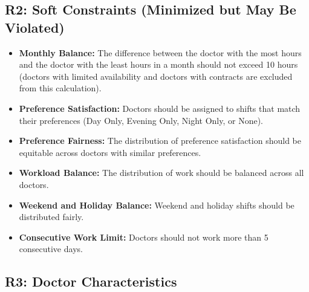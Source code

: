 \documentclass[12pt]{article}
\begin{document}
\subsection*{R2: Soft Constraints (Minimized but May Be Violated)}

\begin{itemize}
    \item \textbf{Monthly Balance:} The difference between the doctor with the most hours and the doctor with the least hours in a month should not exceed 10 hours (doctors with limited availability and doctors with contracts are excluded from this calculation).
    
    \item \textbf{Preference Satisfaction:} Doctors should be assigned to shifts that match their preferences (Day Only, Evening Only, Night Only, or None).
    
    \item \textbf{Preference Fairness:} The distribution of preference satisfaction should be equitable across doctors with similar preferences.
    
    \item \textbf{Workload Balance:} The distribution of work should be balanced across all doctors.
    
    \item \textbf{Weekend and Holiday Balance:} Weekend and holiday shifts should be distributed fairly.
    
    \item \textbf{Consecutive Work Limit:} Doctors should not work more than 5 consecutive days.
\end{itemize}

\subsection*{R3: Doctor Characteristics}
\end{document}

